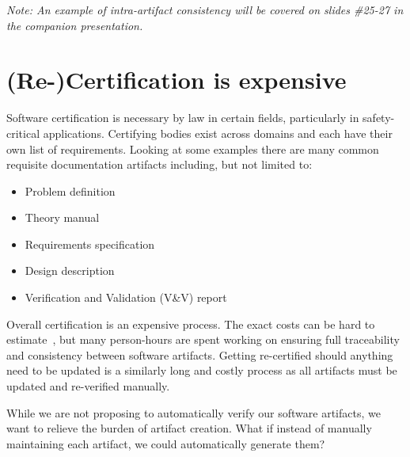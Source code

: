 \documentclass[twocolumn]{article}
\begin{document}
\emph{Note: An example of intra-artifact consistency will be covered on slides 
\#25-27 in the companion presentation.}

\section{(Re-)Certification is expensive}

Software certification is necessary by law in certain fields, particularly in 
safety-critical applications. Certifying bodies exist across domains 
and each have their own list of requirements. Looking at some 
examples \cite{CDRH2002,CSA1999,CSA2009,FDA2014} there are many common  
requisite documentation artifacts including, but not limited to:

\begin{itemize}
\itemsep-.2em
\item Problem definition
\item Theory manual
\item Requirements specification
\item Design description
\item Verification and Validation (V\&V) report
\end{itemize}

Overall certification is an expensive process. The exact costs can be hard to 
estimate~\cite{HatcliffEtAl2009}, but many person-hours are spent 
working on ensuring full traceability and consistency between software 
artifacts. Getting re-certified should anything need to be updated is a 
similarly long and costly process as all artifacts must be updated and 
re-verified manually.

While we are not proposing to automatically verify our software artifacts, we 
want to relieve the burden of artifact creation. What if instead of manually 
maintaining each artifact, we could automatically generate them? 




  
\end{document}
